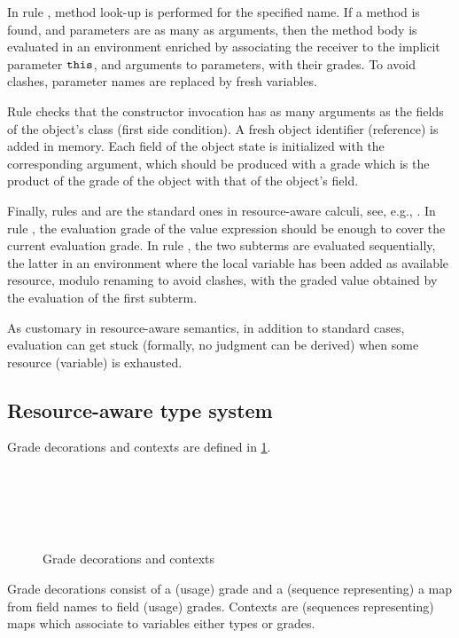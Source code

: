 In rule , method look-up is performed for the specified name. If a method is found, and parameters are as many as arguments, then the method body is evaluated in an environment enriched by associating the receiver to the implicit parameter $\texttt{this}$, and arguments to parameters, with their grades. To avoid clashes, parameter names are replaced by fresh variables.

Rule  checks that the constructor invocation has as many arguments as the fields of the object's class (first side condition). 
A fresh object identifier (reference) is added in memory. Each field of the object state is initialized with the corresponding argument, which should be produced  with a grade which is the product of the grade of the object with that of the object's field.

Finally, rules  and  are the standard ones in resource-aware calculi, see, e.g., \cite{BianchiniDGZ23oopsla}. In rule , the evaluation grade of the value expression should be enough to cover the current evaluation grade.
In rule , the two subterms are evaluated sequentially, the latter in an environment where the local variable has been added  as available resource, modulo renaming to avoid clashes, with the graded value obtained by the evaluation of the first subterm.
  
As customary in resource-aware semantics, in addition to standard cases, evaluation can get stuck (formally, no judgment can be derived) when some resource (variable) is exhausted. 

\subsection{Resource-aware type system}\label{sect:adaptation-typesystem}
 Grade decorations and contexts are defined in \cref{fig:ctx}.
\begin{figure}[ht]
\begin{grammatica} 
\\
\\
\\
\\
\end{grammatica}
\caption{Grade decorations and contexts}
\label{fig:ctx}
\end{figure}
Grade decorations consist of a (usage) grade and a (sequence representing) a map from field names to field (usage) grades. Contexts are (sequences representing) maps which associate to variables either types or grades.  

